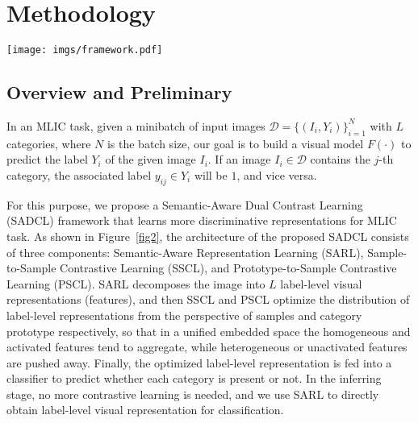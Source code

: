\documentclass{ecai}
\begin{document}
\vspace{-0.1cm}
\section{Methodology}
\begin{figure*}[ht]
	\centering
	\texttt{[image: imgs/framework.pdf]}
	\caption{The overview of the SADCL framework. \textbf{Note that a solid square represents an active state, and a hollow square represents an inactive state}. Meanwhile, different colors represent different categories. ($\cdot$) is a projection network.}
	
	\label{fig2}
\end{figure*}
\subsection{Overview and Preliminary}
In an MLIC task, given a minibatch of input images $\mathcal{D}=\{(I_i,Y_i)\}_{i=1}^N$ with $L$ categories, where $N$ is the batch size, our goal is to build a visual model $F(\cdot)$ to predict the label ${Y}_i$ of the given image $I_i$. If an image $I_i \in \mathcal{D}$ contains the $j$-th category, the associated label $y_{ij} \in Y_i$ will be $1$, and vice versa.

For this purpose, we propose a Semantic-Aware Dual Contrast Learning (SADCL) framework that learns more discriminative representations for MLIC task. As shown in Figure~\ref{fig2}, the architecture of the proposed SADCL consists of three components: Semantic-Aware Representation Learning (SARL), Sample-to-Sample Contrastive Learning (SSCL), and Prototype-to-Sample Contrastive Learning (PSCL). SARL decomposes the image into $L$ label-level visual representations (features), and then SSCL and PSCL optimize the distribution of label-level representations from the perspective of samples and category prototype respectively, so that in a unified embedded space the homogeneous and activated features tend to aggregate, while heterogeneous or unactivated features are pushed away. Finally, the optimized label-level representation is fed into a classifier to predict whether each category is present or not. In the inferring stage, no more contrastive learning is needed, and we use SARL to directly obtain label-level visual representation for classification.
\end{document}
